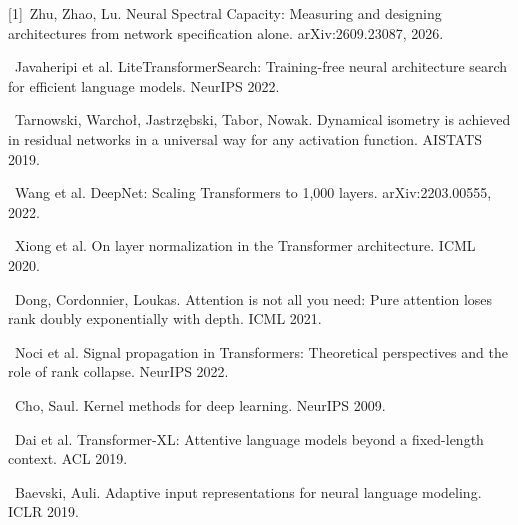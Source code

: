 \documentclass[a4paper,12pt]{article}
\begin{document}
\begingroup\small\setlength{\parskip}{1pt}
[1]~Zhu, Zhao, Lu. Neural Spectral Capacity: Measuring and designing architectures from network specification alone. arXiv:2609.23087, 2026.\par
[2]~Javaheripi et al. LiteTransformerSearch: Training-free neural architecture search for efficient language models. NeurIPS 2022.\par
[3]~Tarnowski, Warchoł, Jastrzębski, Tabor, Nowak. Dynamical isometry is achieved in residual networks in a universal way for any activation function. AISTATS 2019.\par
[4]~Wang et al. DeepNet: Scaling Transformers to 1,000 layers. arXiv:2203.00555, 2022.\par
[5]~Xiong et al. On layer normalization in the Transformer architecture. ICML 2020.\par
[6]~Dong, Cordonnier, Loukas. Attention is not all you need: Pure attention loses rank doubly exponentially with depth. ICML 2021.\par
[7]~Noci et al. Signal propagation in Transformers: Theoretical perspectives and the role of rank collapse. NeurIPS 2022.\par
[8]~Cho, Saul. Kernel methods for deep learning. NeurIPS 2009.\par
[9]~Dai et al. Transformer-XL: Attentive language models beyond a fixed-length context. ACL 2019.\par
[10]~Baevski, Auli. Adaptive input representations for neural language modeling. ICLR 2019.\par
\endgroup
\end{document}

